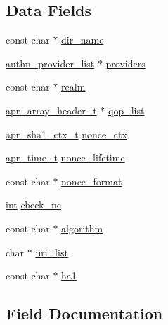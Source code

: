 \subsection*{Data Fields}
\begin{DoxyCompactItemize}
\item 
const char $\ast$ \hyperlink{structdigest__config__struct_aa7bed72630b82bb5cbe11960065c1d6a}{dir\+\_\+name}
\item 
\hyperlink{structauthn__provider__list}{authn\+\_\+provider\+\_\+list} $\ast$ \hyperlink{structdigest__config__struct_ab46c9661b3ac4948eed35fc13cb22059}{providers}
\item 
const char $\ast$ \hyperlink{structdigest__config__struct_a3de3fdaa304b0e6881c86e51805ffaee}{realm}
\item 
\hyperlink{structapr__array__header__t}{apr\+\_\+array\+\_\+header\+\_\+t} $\ast$ \hyperlink{structdigest__config__struct_ac689b01e93609d2089a5719ffa7d53bf}{qop\+\_\+list}
\item 
\hyperlink{structapr__sha1__ctx__t}{apr\+\_\+sha1\+\_\+ctx\+\_\+t} \hyperlink{structdigest__config__struct_ada4ff119965c74c0add9e7d1e08dc28a}{nonce\+\_\+ctx}
\item 
\hyperlink{group__apr__time_gadb4bde16055748190eae190c55aa02bb}{apr\+\_\+time\+\_\+t} \hyperlink{structdigest__config__struct_a91df0b3157a215755d6ba7df84b155da}{nonce\+\_\+lifetime}
\item 
const char $\ast$ \hyperlink{structdigest__config__struct_a7a9df79281f2419fe10d382c3a8c9b1e}{nonce\+\_\+format}
\item 
\hyperlink{pcre_8txt_a42dfa4ff673c82d8efe7144098fbc198}{int} \hyperlink{structdigest__config__struct_a4ecc678a1db5e7fa67ac1e173ac982a9}{check\+\_\+nc}
\item 
const char $\ast$ \hyperlink{structdigest__config__struct_af1976d4bf90a0f55dd039c413fb3336d}{algorithm}
\item 
char $\ast$ \hyperlink{structdigest__config__struct_a8989474a0b2dd4357822f9dffd288870}{uri\+\_\+list}
\item 
const char $\ast$ \hyperlink{structdigest__config__struct_a90a27be6e9fd45388e8f222ba1067132}{ha1}
\end{DoxyCompactItemize}


\subsection{Field Documentation}
